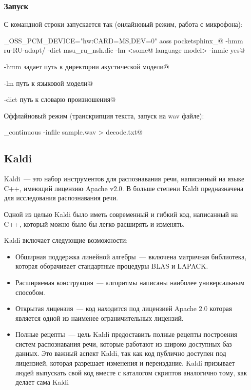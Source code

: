 \documentclass[10pt, a5paper]{article}
\begin{document}
\subsubsection*{Запуск}

С командной строки запускается так (онлайновый режим, работа с микрофона):

\verb@ALSA_OSS_PCM_DEVICE="hw:CARD=MS,DEV=0" aoss pocketsphinx_@
\verb@continuous -hmm ru-RU-adapt/ -dict msu_ru_nsh.dic -lm <some@
\verb@ language model>  -inmic yes@

\verb@-hmm задает путь к директории акустической модели@

\verb@-lm путь к языковой модели@

\verb@-dict путь к словарю произношения@

Оффлайновый режим (транскрипция текста, запуск на wav файле):

\verb@pocketsphinx_continuous -infile sample.wav > decode.txt@

\subsection*{Kaldi}

Kaldi~--- это набор инструментов для распознавания речи, написанный на языке C++, имеющий лицензию Apache v2.0. В больше степени Kaldi предназначена для исследования распознавания речи.

Одной из целью Kaldi было иметь современный и гибкий код, написанный на C++, который можно было бы легко расширять и изменять.

Kaldi включает следующие возможности:

\begin{itemize}
  \item Обширная поддержка линейной алгебры~--- включена матричная библиотека, которая оборачивает стандартные процедуры BLAS и LAPACK.
  \item Расширяемая конструкция~--- алгоритмы написаны наиболее универсальным способом.
  \item Открытая лицензия~--- код находится под лицензией Apache 2.0 которая является одной из наименее ограничительных лицензий.
  \item Полные рецепты~--- цель Kaldi предоставить полные рецепты построения систем распознавания речи, которые работают из широко доступных баз данных. Это важный аспект Kaldi, так как код публично доступен под лицензией, которая разрешает изменения и переиздание. Kaldi призывает людей выпускать свой код вместе с каталогом скриптов аналогично тому, как делает сама Kaldi
\end{itemize}
\end{document}
